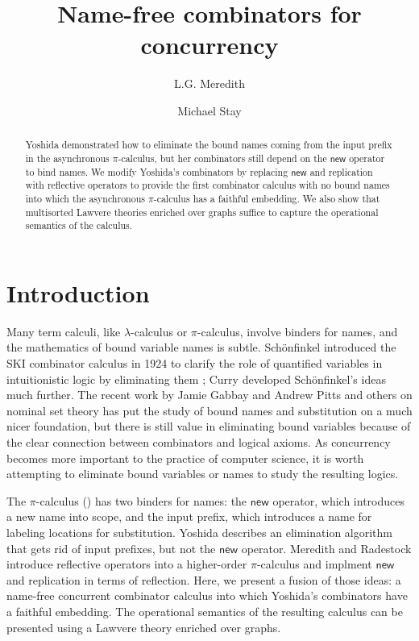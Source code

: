 \documentclass{llncs}
\title{Name-free combinators for concurrency}
\author{
L.G. Meredith\inst{1}\\
\and
Michael Stay\inst{2}\\
}
\institute{
  {RChain Cooperative}\\
  \email{\fontsize{8}{8}\selectfont greg@rchain.coop}
  \and
  {Pyrofex Corp.}\\
  \email{\fontsize{8}{8}\selectfont stay@pyrofex.net}\\
}
\newcommand{\new}{\mathsf{new}}
\newcommand{\pic}{$\pi$-calculus}
\begin{document}
\maketitle
\begin{abstract}
\noindent
  Yoshida demonstrated how to eliminate the bound names coming from
  the input prefix in the asynchronous {\pic}, but her combinators
  still depend on the $\new$ operator to bind names.
  We modify Yoshida's combinators by replacing $\new$ and replication
  with reflective operators to provide the first combinator calculus
  with no bound names into which the asynchronous {\pic} has a faithful
  embedding.  We also show that multisorted Lawvere theories enriched 
  over graphs suffice to capture the operational semantics of the calculus.
\end{abstract}

\section{Introduction}

Many term calculi, like $\lambda$-calculus or {\pic}, involve
binders for names, and the mathematics of bound variable names is
subtle.  Sch\"onfinkel introduced the SKI combinator calculus in 1924
to clarify the role of quantified variables in intuitionistic logic by
eliminating them \cite{finkel}; Curry developed Sch\"onfinkel's ideas
much further.  The recent work by Jamie Gabbay and Andrew Pitts
\cite{DBLP:journals/fac/GabbayP02} and others
\cite{DBLP:journals/jcss/Clouston14} on nominal set theory has put the
study of bound names and substitution on a much nicer foundation, but
there is still value in eliminating bound variables because of the
clear connection between combinators and logical axioms.  As
concurrency becomes more important to the practice of computer
science, it is worth attempting to eliminate bound variables or names
to study the resulting logics.

The {\pic} (\cite{milner91polyadicpi}) has two binders for names: the
$\new$ operator, which introduces a new name into scope, and the input
prefix, which introduces a name for labeling locations for
substitution.  Yoshida \cite{DBLP:journals/tcs/Yoshida02} describes an
elimination algorithm that gets rid of input prefixes, but not the
$\new$ operator.  Meredith and Radestock
\cite{DBLP:journals/entcs/MeredithR05} introduce reflective operators
into a higher-order {\pic} and implment $\new$ and replication in
terms of reflection.  Here, we present a fusion of those ideas: a
name-free concurrent combinator calculus into which Yoshida's
combinators have a faithful embedding.  The operational semantics of
the resulting calculus can be presented using a Lawvere theory
enriched over graphs.
\end{document}

